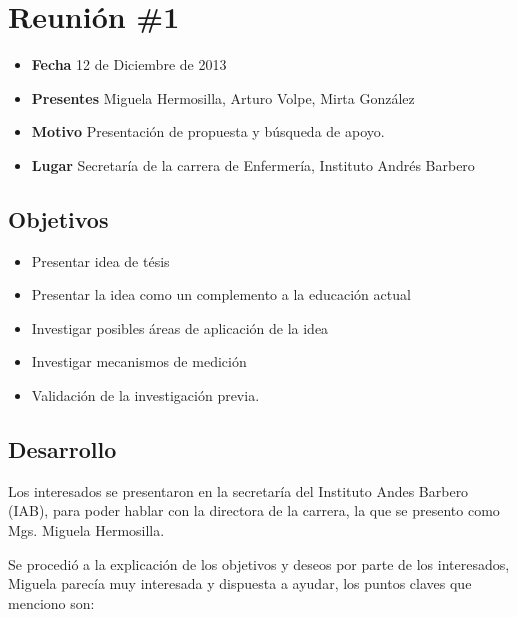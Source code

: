 \section{Reunión \#1}

\begin{itemize}
\itemsep1pt\parskip0pt
\item
  \textbf{Fecha} 12 de Diciembre de 2013
\item
  \textbf{Presentes} Miguela Hermosilla, Arturo Volpe, Mirta González
\item
  \textbf{Motivo} Presentación de propuesta y búsqueda de apoyo.
\item
  \textbf{Lugar} Secretaría de la carrera de Enfermería, Instituto
  Andrés Barbero
\end{itemize}

\subsection{Objetivos}

\begin{itemize}
\itemsep1pt\parskip0pt
\item
  Presentar idea de tésis
\item
  Presentar la idea como un complemento a la educación actual
\item
  Investigar posibles áreas de aplicación de la idea
\item
  Investigar mecanismos de medición
\item
  Validación de la investigación previa.
\end{itemize}

\subsection{Desarrollo}

Los interesados se presentaron en la secretaría del Instituto Andes
Barbero (IAB), para poder hablar con la directora de la carrera, la que
se presento como Mgs. Miguela Hermosilla.

Se procedió a la explicación de los objetivos y deseos por parte de los
interesados, Miguela parecía muy interesada y dispuesta a ayudar, los
puntos claves que menciono son:

